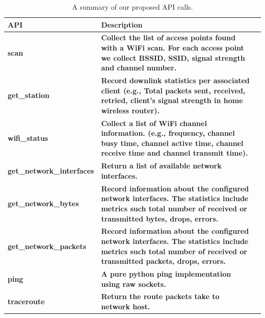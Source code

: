 {\begin{table}
\scriptsize
\centering
\begin{tabular}{|p{}| p{}| m{}|}
\hline
\textbf{API}    &  \textbf{Description} \\
 \hline
 {\bf scan} & {\bf Collect the list of access points found with a WiFi scan. For each access point we collect BSSID, SSID, signal strength and channel number.} \\
\hline
 {\bf get\_station} & {\bf Record downlink statistics per associated client (e.g., Total packets sent, received, retried, client's signal strength in home wireless router).} \\
\hline
 {\bf wifi\_status} & {\bf Collect a list of WiFi channel information. (e.g., frequency, channel busy time, channel active time, channel receive time and channel transmit time).} \\
\hline
 {\bf get\_network\_interfaces} & {\bf Return a list of available network interfaces.} \\
\hline
 {\bf get\_network\_bytes} & {\bf Record information about the configured network interfaces. The statistics include metrics such total number of received or transmitted bytes, drops, errors.} \\
\hline
 {\bf get\_network\_packets} & {\bf Record information about the configured network interfaces. The statistics include metrics such total number of received or transmitted packets, drops, errors.} \\
\hline
 {\bf ping} & {\bf A pure python ping implementation using raw sockets.} \\
\hline
 {\bf traceroute} & {\bf Return the route packets take to network host. } \\
\hline
\end{tabular}
\caption {A summary of our proposed API calls.}
\label{table:new_api}
\end{table}

}
